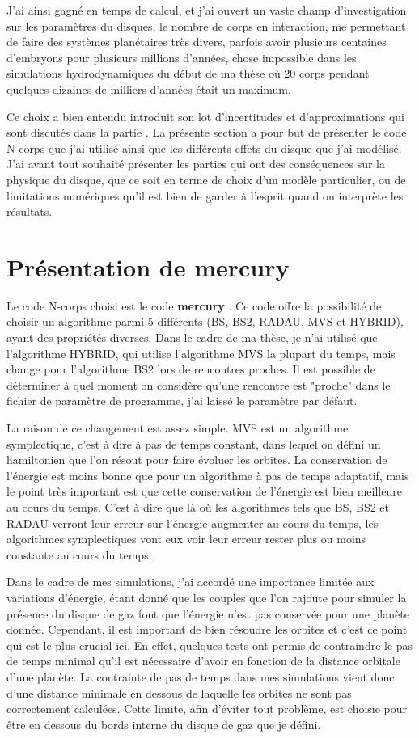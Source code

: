 \documentclass[logos,parttoc]{bordeaux-thesis}
\begin{document}
J'ai ainsi gagné en temps de calcul, et j'ai ouvert un vaste champ d'investigation sur les paramètres du disques, le nombre de corps en interaction, me permettant de faire des systèmes planétaires très divers, parfois avoir plusieurs centaines d'embryons pour plusieurs millions d'années, chose impossible dans les simulations hydrodynamiques du début de ma thèse où 20 corps pendant quelques dizaines de milliers d'années était un maximum. 

Ce choix a bien entendu introduit son lot d'incertitudes et d'approximations qui sont discutés dans la partie . La présente section a pour but de présenter le code N-corps que j'ai utilisé ainsi que les différents effets du disque que j'ai modélisé. J'ai avant tout souhaité présenter les parties qui ont des conséquences sur la physique du disque, que ce soit en terme de choix d'un modèle particulier, ou de limitations numériques qu'il est bien de garder à l'esprit quand on interprète les résultats.

\section{Présentation de mercury}
Le code N-corps choisi est le code \textbf{mercury} \citep{chambers1999hybrid}. Ce code offre la possibilité de choisir un algorithme parmi 5 différents (BS, BS2, RADAU, MVS et HYBRID), ayant des propriétés diverses. Dans le cadre de ma thèse, je n'ai utilisé que l'algorithme HYBRID, qui utilise l'algorithme MVS la plupart du temps, mais change pour l'algorithme BS2 lors de rencontres proches. Il est possible de déterminer à quel moment on considère qu'une rencontre est "proche" dans le fichier de paramètre de programme, j'ai laissé le paramètre par défaut. 

La raison de ce changement est assez simple. MVS est un algorithme symplectique, c'est à dire à pas de temps constant, dans lequel on défini un hamiltonien que l'on résout pour faire évoluer les orbites. La conservation de l'énergie est moins bonne que pour un algorithme à pas de temps adaptatif, mais le point très important est que cette conservation de l'énergie est bien meilleure au cours du temps. C'est à dire que là où les algorithmes tels que BS, BS2 et RADAU verront leur erreur sur l'énergie augmenter au cours du temps, les algorithmes symplectiques vont eux voir leur erreur rester plus ou moins constante au cours du temps. 

Dans le cadre de mes simulations, j'ai accordé une importance limitée aux variations d'énergie, étant donné que les couples que l'on rajoute pour simuler la présence du disque de gaz font que l'énergie n'est pas conservée pour une planète donnée. Cependant, il est important de bien résoudre les orbites et c'est ce point qui est le plus crucial ici. En effet, quelques tests ont permis de contraindre le pas de temps minimal qu'il est nécessaire d'avoir en fonction de la distance orbitale d'une planète. La contrainte de pas de temps dans mes simulations vient donc d'une distance minimale en dessous de laquelle les orbites ne sont pas correctement calculées. Cette limite, afin d'éviter tout problème, est choisie pour être en dessous du bords interne du disque de gaz que je défini.
\end{document}
